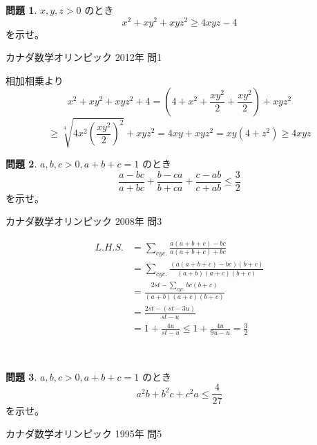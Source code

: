 \documentclass[uplatex, a5paper]{jsarticle}
\makeatletter
\theoremstyle{definition}
\newtheorem{prob}{問題}
\renewenvironment{proof}[1][\proofname]{
  \pushQED{\qed}%
  \normalfont \topsep6\p@\@plus6\p@\relax
  \trivlist
  \item[\hskip\labelsep
    #1\@addpunct{\textbf{.}}]\ignorespaces
}{%
  \popQED\endtrivlist\@endpefalse
}
\providecommand{\proofname}{証明}
\newcommand{\lhs }{ L.H.S. }
\def\qed{\hfill $\Box$}
\makeatother
\begin{document}
\newpage


\begin{prob}
  \(x,y,z>0\)
  のとき
  \[
  x^2+xy^2+xyz^2 \geq 4xyz-4
  \]
  を示せ。
  \begin{flushright}
    カナダ数学オリンピック 2012年 問1
  \end{flushright}
\end{prob}


\begin{proof}
  相加相乗より
  \[
  x^2+xy^2+xyz^2 + 4 = \left( 4+ x^2 + \frac{xy^2}{2} + \frac{xy^2}{2} \right) + xyz^2
  \]
  \[
  \geq \sqrt[4]{4x^2\left( \frac{xy^2}{2} \right) ^2 } + xyz^2 = 4xy+xyz^2 = xy(4+z^2) \geq 4xyz
  \]
\end{proof}









\newpage

\begin{prob}
  \(a,b,c > 0 , a+b+c = 1\)
  のとき
  \[
  \frac{a-bc}{a+bc} + \frac{b-ca}{b+ca} + \frac{c-ab}{c+ab} \leq \frac{3}{2}
  \]
  を示せ。
  \begin{flushright}
    カナダ数学オリンピック 2008年 問3
  \end{flushright}
\end{prob}


\begin{proof}

\begin{align*}
\lhs &= \sum_{cyc.} \frac{a(a+b+c)-bc}{a(a+b+c)+bc} \\
&= \sum_{cyc.} \frac{\left( a(a+b+c)-bc \right) ( b+c ) }{(a+b)(a+c)(b+c) } \\
&= \frac{ 2st-\sum_{cyc.} bc(b+c) }{(a+b)(a+c)(b+c) } \\
&= \frac{ 2st-(st-3u) }{ st-u } \\
&= 1+\frac{ 4u }{ st-u } \leq 1+\frac{4u}{9u-u} = \frac{3}{2}
\end{align*}
\end{proof}


\







\newpage

\begin{prob}
  \(a,b,c > 0 , a+b+c = 1\)
  のとき
  \[
  a^2b+b^2c+c^2a \leq \frac{4}{27}
  \]
  を示せ。
  \begin{flushright}
    カナダ数学オリンピック 1995年 問5
  \end{flushright}
\end{prob}
\end{document}
